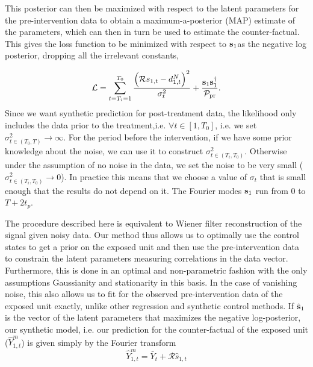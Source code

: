 \documentclass{article}
\def\bs{{\bf s}}
\def\pprior{\mathcal{P_{\rm pr}}}
\begin{document}
This posterior can then be maximized with respect to the latent parameters for the pre-intervention data to obtain a maximum-a-posterior (MAP) estimate of the parameters, which can then in turn be used to estimate the counter-factual. This gives the loss function to be minimized with 
respect to $\bs_1$as the negative log posterior, dropping all the irrelevant constants,

\begin{equation}
    \mathcal{L} = \sum_{t = T_i=1}^{T_0} \frac{ \Big(\mathcal{R}s_{1, t} - d^N_{1,t} \Big)^2}{\sigma_t^2} + \frac{\bs_{1}\bs_{1}^\dagger}{\pprior}.
    \label{eq:posterior2}
\end{equation}
Since we want synthetic prediction for post-treatment data, the likelihood only 
includes the data prior to the treatment,i.e. $\forall t \in [1, T_0]$, i.e. we set $\sigma^2_{t \in (T_0, T)} \rightarrow \infty$. For the period before the intervention, if we have some prior knowledge about the noise, we can use it to construct $\sigma^2_{t \in (T_i, T_0)}$. Otherwise under the assumption of no noise in the data, we set the noise to be very small ($\sigma^2_{t \in (T_i, T_0)} \rightarrow 0$). In practice this means that 
we choose a value of $\sigma_t$ that is small enough that the results do not depend on it. 
The 
Fourier modes $\bs_{1}$ run from 0 to $T+2t_p$.  


The procedure described here is equivalent to Wiener filter reconstruction of the signal given noisy data. Our method thus allows us to optimally use the control states to get a prior on the exposed unit and then use the pre-intervention data to constrain the latent parameters measuring correlations in the data vector. Furthermore, this is done in an optimal and non-parametric fashion with the only assumptions Gaussianity and stationarity in this basis. In the case of vanishing noise, this also allows us to fit for the observed pre-intervention data of the exposed unit exactly, unlike other regression and synthetic control methods. If $\hat \bs_{1}$ is the vector of the latent parameters that maximizes the negative log-posterior, our synthetic model, i.e. our prediction for the counter-factual of the exposed unit ($\hat{Y}^m_{1, t}$) is given simply by the Fourier transform
\begin{equation}
    \hat{Y}^m_{1,t} = \bar{Y}_t + \mathcal{R}\hat{s}_{1, t}
    \label{eq:model}
\end{equation}
\end{document}
